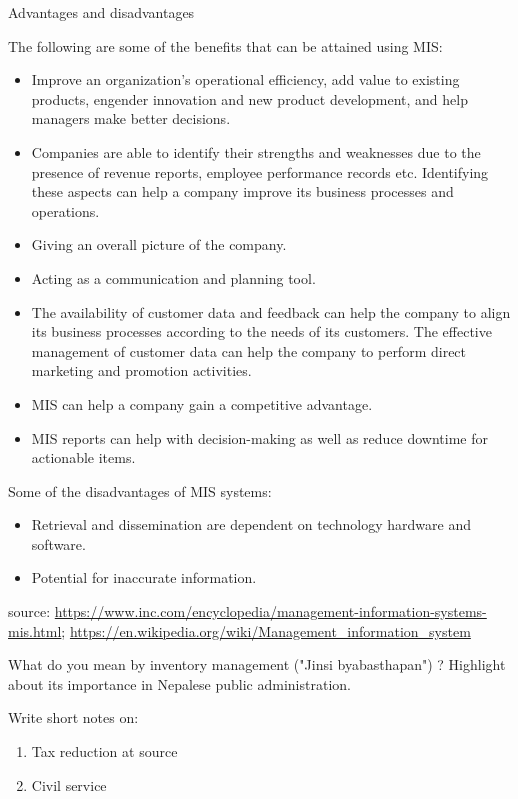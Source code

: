\documentclass[
  openany]{book}
\newcommand{\question}{\item}
\begin{document}
\begin{questions}
Advantages and disadvantages

The following are some of the benefits that can be attained using MIS:

\begin{itemize}
\item Improve an organization's operational efficiency, add value to existing products, engender innovation and new product development, and help managers make better decisions.
\item Companies are able to identify their strengths and weaknesses due to the presence of revenue reports, employee performance records etc. Identifying these aspects can help a company improve its business processes and operations.
\item Giving an overall picture of the company.
\item Acting as a communication and planning tool.
\item The availability of customer data and feedback can help the company to align its business processes according to the needs of its customers. The effective management of customer data can help the company to perform direct marketing and promotion activities.
\item MIS can help a company gain a competitive advantage.
\item MIS reports can help with decision-making as well as reduce downtime for actionable items.
\end{itemize}

Some of the disadvantages of MIS systems:
\begin{itemize}
\item Retrieval and dissemination are dependent on technology hardware and software.
\item Potential for inaccurate information.
\end{itemize}

source: \url{https://www.inc.com/encyclopedia/management-information-systems-mis.html}; \url{https://en.wikipedia.org/wiki/Management_information_system}

\question What do you mean by inventory management ("Jinsi byabasthapan") ? Highlight about its importance in Nepalese public administration.

\question Write short notes on:
\begin{enumerate}[label*=\alph*., leftmargin=1cm]
\item Tax reduction at source
\item Civil service 
\end{enumerate}


\end{questions}
\end{document}
